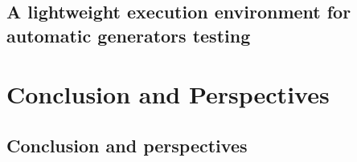 \documentclass[letterpaper,12pt,titlepage, english, openright]{book}
\newcommand\blankpage{%
	\null
	\thispagestyle{empty}%
	\addtocounter{page}{-1}%
	\newpage}
\let\origdoublepage\cleardoublepage
\newcommand{\clearemptydoublepage}{%
  \clearpage{\pagestyle{empty}\origdoublepage}}
\let\cleardoublepage\clearemptydoublepage
\begin{document}
\chapter{A lightweight execution environment for automatic generators testing }\label{chap:docker}

\part{Conclusion and Perspectives}
\chapter[Conclusion and perspectives]{Conclusion and perspectives}\label{chap:conclusion}














\cleardoublepage %
\renewcommand*{\bibname}{References}





\nocite{*}

\newpage
\cleardoublepage
{} \label{listoffigs}
\listoffigures

\newpage
{} \label{listoftabs}
\listoftables
\afterpage{\blankpage}
%

\end{document}

